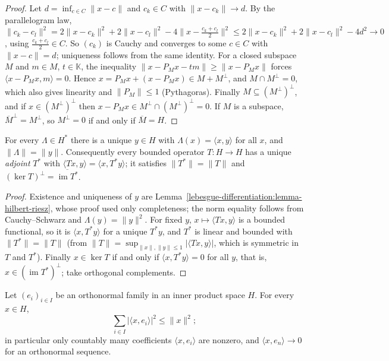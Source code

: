 \begin{proof}
Let $d = \inf_{c \in C}\|x - c\|$ and $c_k \in C$ with $\|x - c_k\| \to d$. By the parallelogram law,
$\|c_k - c_l\|^2 = 2\|x - c_k\|^2 + 2\|x - c_l\|^2 - 4\|x - \tfrac{c_k + c_l}{2}\|^2 \leq 2\|x - c_k\|^2 + 2\|x - c_l\|^2 - 4d^2 \to 0$, using $\tfrac{c_k+c_l}{2} \in C$. So $(c_k)$ is Cauchy and converges to some
$c \in C$ with $\|x - c\| = d$; uniqueness follows from the same identity. For a closed subspace $M$ and $m \in M$, $t \in \mathbb{K}$, the inequality $\|x - P_Mx - tm\| \geq \|x - P_Mx\|$ forces
$\langle x - P_Mx, m \rangle = 0$. Hence $x = P_Mx + (x - P_Mx) \in M + M^\perp$, and $M \cap M^\perp = 0$, which also gives linearity and $\|P_M\| \leq 1$ (Pythagoras). Finally $M \subseteq (M^\perp)^\perp$, and
if $x \in (M^\perp)^\perp$ then $x - P_Mx \in M^\perp \cap (M^\perp)^\perp = 0$. If $M$ is a subspace, $\overline{M}^\perp = M^\perp$, so $M^\perp = 0$ if and only if $\overline{M} = H$.
\end{proof}

\begin{theorem}\label{functional-analysis:theorem-riesz-representation}
For every $\Lambda \in H^*$ there is a unique $y \in H$ with $\Lambda(x) = \langle x, y \rangle$ for all $x$, and $\|\Lambda\| = \|y\|$. Consequently every bounded operator $T \colon H \to H$ has a unique
\emph{adjoint} $T^*$ with $\langle Tx, y \rangle = \langle x, T^*y \rangle$; it satisfies $\|T^*\| = \|T\|$ and $(\ker T)^\perp = \overline{\operatorname{im}T^*}$.
\end{theorem}

\begin{proof}
Existence and uniqueness of $y$ are Lemma~\ref{lebesgue-differentiation:lemma-hilbert-riesz}, whose proof used only completeness; the norm equality follows from Cauchy--Schwarz and $\Lambda(y) = \|y\|^2$. For fixed
$y$, $x \mapsto \langle Tx, y \rangle$ is a bounded functional, so it is $\langle x, T^*y \rangle$ for a unique $T^*y$, and $T^*$ is linear and bounded with $\|T^*\| = \|T\|$ (from
$\|T\| = \sup_{\|x\|, \|y\| \leq 1}|\langle Tx, y \rangle|$, which is symmetric in $T$ and $T^*$). Finally $x \in \ker T$ if and only if $\langle x, T^*y \rangle = 0$ for all $y$, that is, $x \in (\operatorname{im}T^*)^\perp$; take orthogonal
complements.
\end{proof}

\begin{proposition}\label{functional-analysis:proposition-bessel}
Let $(e_i)_{i \in I}$ be an orthonormal family in an inner product space $H$. For every $x \in H$,
\[
\sum_{i \in I}|\langle x, e_i \rangle|^2 \leq \|x\|^2;
\]
in particular only countably many coefficients $\langle x, e_i\rangle$ are nonzero, and $\langle x, e_n\rangle \to 0$ for an orthonormal sequence.
\end{proposition}

